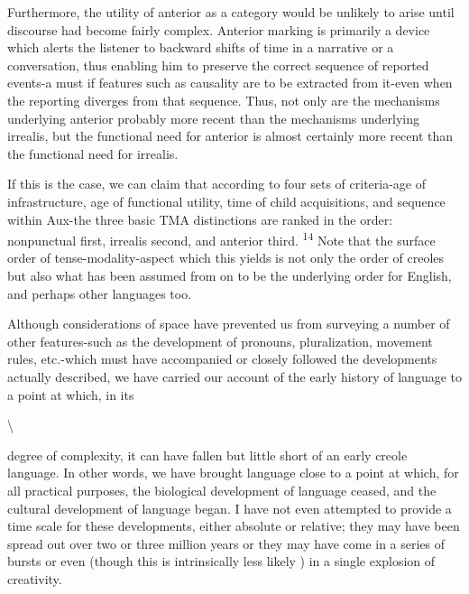 Furthermore, the utility of anterior as a category would be unlikely to arise until discourse had become fairly complex. Anterior marking is primarily a device which alerts the listener to backward shifts of time in a narrative or a conversation, thus enabling him to preserve the correct sequence of reported events-a must if features such as causality are to be extracted from it-even when the reporting diverges from that sequence. Thus, not only are the mechanisms under\-lying anterior probably more recent than the mechanisms underlying irrealis, but the functional need for anterior is almost certainly more recent than the functional need for irrealis.

If this is the case, we can claim that according to four sets of criteria-age of infrastructure, age of functional utility, time of child acquisitions, and sequence within Aux-the three basic TMA distinc\-tions are ranked in the order: nonpunctual first, irrealis second, and anterior third. \textsuperscript{1}\textsuperscript{4} Note that the surface order of tense-modality-aspect which this yields is not only the order of creoles but also what has been assumed from \citet{Chomsky1957} on to be the underlying order for English, and perhaps other languages too.

Although considerations of space have prevented us from survey\-ing a number of other features-such as the development of pronouns, pluralization, movement rules, etc.-which must have accompanied or closely followed the developments actually described, we have carried our account of the early history of language to a point at which, in its

{\textbackslash}


degree of complexity, it can have fallen but little short of an early creole language. In other words, we have brought language close to a point at which, for all practical purposes, the biological development of language ceased, and the cultural development of language began. I have not even attempted to provide a time scale for these develop\-ments, either absolute or relative; they may have been spread out over two or three million years or they may have come in a series of bursts or even (though this is intrinsically less likely ) in a single explosion of creativity.

